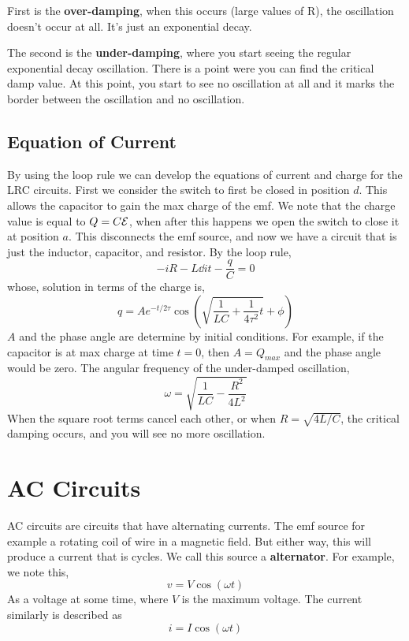 First is the \textbf{over-damping}, when this occurs (large values of R), the oscillation doesn't occur at all. It's just an exponential decay. 

The second is the \textbf{under-damping}, where you start seeing the regular exponential decay oscillation. 
There is a point were you can find the critical damp value. At this point, you start to see no oscillation at all and it marks the border between the oscillation and no oscillation.

\subsection{Equation of Current}
By using the loop rule we can develop the equations of current and charge for the LRC circuits. 
First we consider the switch to first be closed in position $d$. This allows the capacitor to gain the max charge of the emf. We note that the charge value is equal to $Q=C\mathcal{E}$, when after this happens we open the switch to close it at position $a$. This disconnects the emf source, and now we have a circuit that is just the inductor, capacitor, and resistor. 
By the loop rule, 
\begin{equation*}
	-iR - L\dd{i}{t} - \frac{q}{C} = 0 
\end{equation*}
whose, solution in terms of the charge is, 
\begin{equation*}
	q = Ae^{-t/2\tau}\cos(\sqrt{\frac{1}{LC}+\frac{1}{4\tau^2}t} + \phi)
\end{equation*}
$A$ and the phase angle are determine by initial conditions. For example, if the capacitor is at max charge at time $t=0$, then $A=Q_{max}$ and the phase angle would be zero.
The angular frequency of the under-damped oscillation, 
\begin{equation*}
	\omega = \sqrt{\frac{1}{LC} - \frac{R^2}{4L^2}}
\end{equation*}
When the square root terms cancel each other, or when $R=\sqrt{4L/C}$, the critical damping occurs, and you will see no more oscillation. 

\section{AC Circuits}
AC circuits are circuits that have alternating currents. The emf source for example a rotating coil of wire in a magnetic field. But either way, this will produce a current that is 
cycles. We call this source a \textbf{alternator}. For example, we note this, 
\begin{equation*}
	v = V\cos(\omega t) 
\end{equation*}	
As a voltage at some time, where $V$ is the maximum voltage. The current similarly is described as 
\begin{equation*}
	i = I\cos(\omega t) 
\end{equation*}
